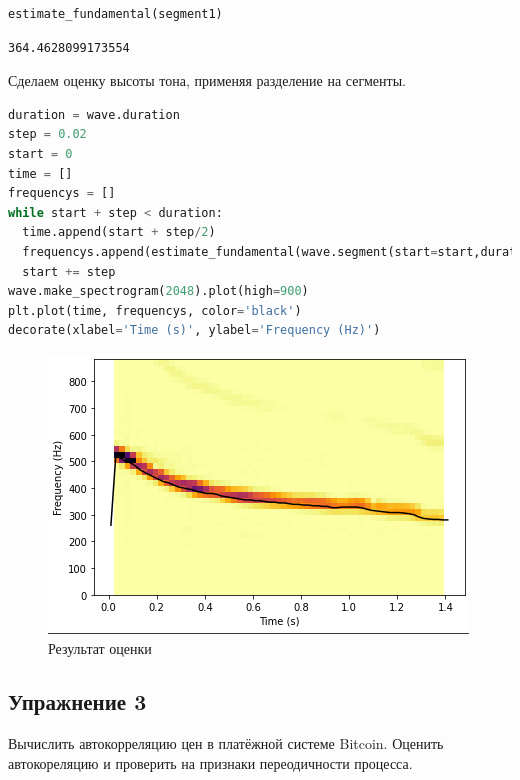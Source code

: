\begin{lstlisting}[language=Python]
estimate_fundamental(segment1)
\end{lstlisting}
\begin{lstlisting}
364.4628099173554
\end{lstlisting}

Сделаем оценку высоты тона, применяя разделение на сегменты.

\begin{lstlisting}[language=Python]
duration = wave.duration
step = 0.02
start = 0
time = []
frequencys = []
while start + step < duration:
  time.append(start + step/2)
  frequencys.append(estimate_fundamental(wave.segment(start=start,duration=step)))
  start += step
wave.make_spectrogram(2048).plot(high=900)
plt.plot(time, frequencys, color='black')
decorate(xlabel='Time (s)', ylabel='Frequency (Hz)')
\end{lstlisting}
\begin{figure}[H]
	\begin{center}
		\includegraphics[scale=1]{fig/lab05/lab5_4.png}
		\caption{Результат оценки}
	\end{center}
\end{figure}

\subsection{Упражнение 3}

Вычислить автокорреляцию цен в платёжной системе Bitcoin. Оценить автокореляцию и проверить на признаки переодичности процесса.

